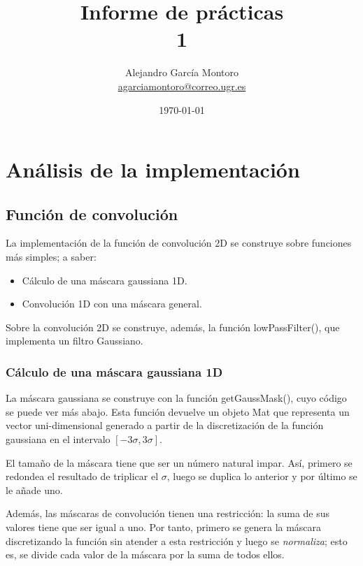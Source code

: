 \documentclass[a4paper, 11pt]{article}
\title{Informe de prácticas \\ 1}
\author{Alejandro García Montoro\\
    \href{mailto:agarciamontoro@correo.ugr.es}{agarciamontoro@correo.ugr.es}}
\date{\today}
\theoremstyle{definition}
\theoremstyle{theorem}
\begin{document}
  \maketitle

  \section{Análisis de la implementación}

  \subsection{Función de convolución}

  La implementación de la función de convolución 2D se construye sobre funciones más simples; a saber:
  \begin{itemize}
      \item Cálculo de una máscara gaussiana 1D.
      \item Convolución 1D con una máscara general.
  \end{itemize}

  Sobre la convolución 2D se construye, además, la función lowPassFilter(), que implementa un filtro Gaussiano.

  \subsubsection*{Cálculo de una máscara gaussiana 1D}
  La máscara gaussiana se construye con la función getGaussMask(), cuyo código se puede ver más abajo. Esta función devuelve un objeto Mat que representa un vector uni-dimensional generado a partir de la discretización de la función gaussiana en el intervalo $[-3\sigma, 3\sigma]$.

  El tamaño de la máscara tiene que ser un número natural impar. Así, primero se redondea el resultado de triplicar el $\sigma$, luego se duplica lo anterior y por último se le añade uno.

  Además, las máscaras de convolución tienen una restricción: la suma de sus valores tiene que ser igual a uno. Por tanto, primero se genera la máscara discretizando la función sin atender a esta restricción y luego se \emph{normaliza}; esto es, se divide cada valor de la máscara por la suma de todos ellos.
\end{document}
